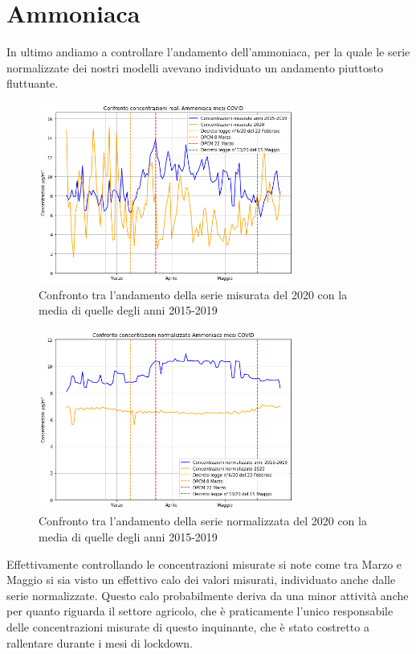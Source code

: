 \documentclass[a4paper]{report}
\begin{document}
\section{Ammoniaca}
In ultimo andiamo a controllare l'andamento dell'ammoniaca, per la quale le serie normalizzate dei nostri modelli avevano individuato un andamento piuttosto fluttuante.

\begin{figure}[h]
\centering
\includegraphics[width=0.75\textwidth]{ammoniaca_covid}
\caption{Confronto tra l'andamento della serie misurata del 2020 con la media di quelle degli anni 2015-2019}
\label{fig:ammoniaca_covid}
\end{figure}

\begin{figure}[h]
\centering
\includegraphics[width=0.75\textwidth]{ammoniaca_covid_norm}
\caption{Confronto tra l'andamento della serie normalizzata del 2020 con la media di quelle degli anni 2015-2019}
\label{fig:ammoniaca_covid_norm}
\end{figure}

Effettivamente controllando le concentrazioni misurate si note come tra Marzo e Maggio si sia visto un effettivo calo dei valori misurati, individuato anche dalle serie normalizzate.
Questo calo probabilmente deriva da una minor attività anche per quanto riguarda il settore agricolo, che è praticamente l'unico responsabile delle concentrazioni misurate di questo inquinante, che è stato costretto a rallentare durante i mesi di lockdown.
\end{document}
